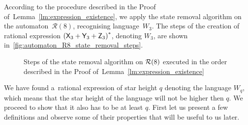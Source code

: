 \begin{example}
    According to the procedure described in the Proof of~Lemma~\ref*{lm:expression_existence}, we apply the state removal algorithm on the automaton~${\mathcal{R}(8)}$, recognising language~$W_3$. The steps of the creation of rational expression ${({\mathsf{X}}_3 + {\mathsf{Y}}_3 + {\mathsf{Z}}_3)}^*$, denoting $W_3$, are shown in~\autoref*{fig:automaton_R8_state_removal_steps}.

    \begin{figure}[h]%
        \centerline{
            \hspace{-15mm}%
            \qquad
            \qquad
            \subfloat[]{%
                }
        }
        \vspace{5mm}
        \centerline{
            \hspace{-15mm}%
            \subfloat[]{%
                }%
            \quad
            \subfloat[]{%
                }
            \quad
        }
        \vspace{5mm}
        \centerline{
            \hspace{-15mm}%
            \subfloat[]{%
                }%
            \quad
            \quad
        }
        \caption{Steps of the state removal algorithm on ${\mathcal{R}}(8)$ executed in the order described in the Proof of~Lemma~\ref*{lm:expression_existence}}\label{fig:automaton_R8_state_removal_steps}%
    \end{figure}
\end{example}

We have found a~rational expression of star height $q$ denoting the language $W_q$, which means that the star height of the language will not be higher then $q$. We proceed to show that it also has to be at least $q$. First let us present a few definitions and observe some of their properties that will be useful to us later.

